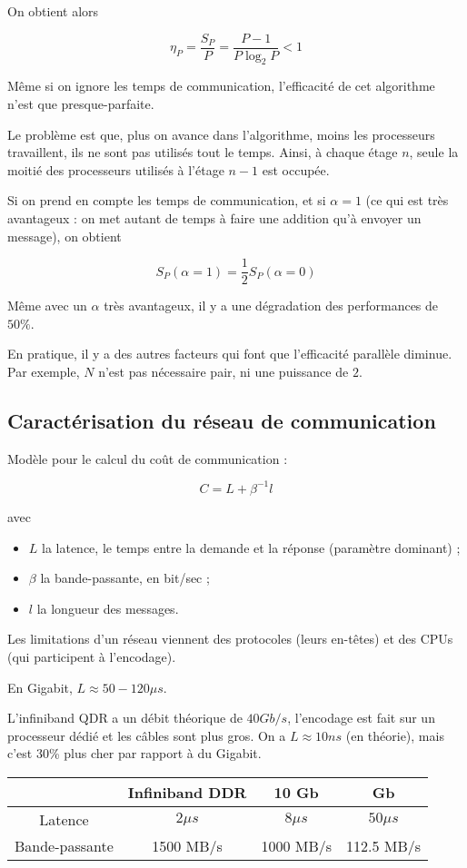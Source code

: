 On obtient alors

$$\eta_P = \frac{S_P}{P} = \frac{P - 1}{P \log_2 P} < 1$$

Même si on ignore les temps de communication, l'efficacité de cet algorithme n'est que presque-parfaite.

Le problème est que, plus on avance dans l'algorithme, moins les processeurs travaillent, ils ne sont pas utilisés tout le temps. Ainsi, à chaque étage $n$, seule la moitié des processeurs utilisés à l'étage $n - 1$ est occupée.

Si on prend en compte les temps de communication, et si $\alpha = 1$ (ce qui est très avantageux : on met autant de temps à faire une addition qu'à envoyer un message), on obtient

$$S_P(\alpha = 1) = \frac{1}{2}S_P(\alpha = 0)$$

Même avec un $\alpha$ très avantageux, il y a une dégradation des performances de $50\%$.

En pratique, il y a des autres facteurs qui font que l'efficacité parallèle diminue. Par exemple, $N$ n'est pas nécessaire pair, ni une puissance de $2$.


	\subsection{Caractérisation du réseau de communication}
	
	Modèle pour le calcul du coût de communication :
	
	$$C = L + \beta^{-1}l$$
	
	avec
	
	\begin{itemize}
		\item $L$ la latence, le temps entre la demande et la réponse (paramètre dominant) ;
		\item $\beta$ la bande-passante, en bit/sec ;
		\item $l$ la longueur des messages.
	\end{itemize}
	
	Les limitations d'un réseau viennent des protocoles (leurs en-têtes) et des CPUs (qui participent à l'encodage).
	
	En Gigabit, $L \approx 50-120 \mu s$.
	
	L'infiniband QDR a un débit théorique de $40Gb/s$, l'encodage est fait sur un processeur dédié et les câbles sont plus gros. On a $L \approx 10 ns$ (en théorie), mais c'est 30\% plus cher par rapport à du Gigabit. \\
	
\begin{center}
	
	\begin{tabular}{|c|c|c|c|}
\hline 
  & Infiniband DDR & 10 Gb & Gb \\ 
\hline 
Latence & $2\mu s$ & $8 \mu s$ & $50 \mu s$ \\ 
\hline 
Bande-passante & 1500 MB/s & 1000 MB/s & 112.5 MB/s \\ 
\hline 
\end{tabular} 
\end{center}